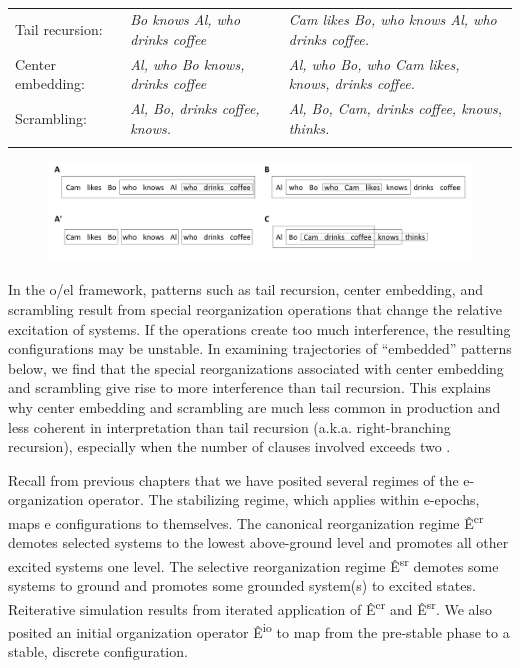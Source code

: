 \begin{table}
\begin{tabularx}{\textwidth}{lQQ}
\lsptoprule
Tail recursion: & \textit{Bo knows Al, who drinks coffee} & \textit{Cam likes Bo, who knows Al, who drinks coffee.}\\
Center embedding: & \textit{Al, who Bo knows, drinks coffee} & \textit{Al, who Bo, who Cam likes, knows, drinks coffee.}\\
Scrambling: & \textit{Al, Bo, drinks coffee, knows.} & \textit{Al, Bo, Cam, drinks coffee, knows, thinks.}\\
\lspbottomrule
\end{tabularx}
\caption{\missingcaption}\label{tab:5:3}
\end{table}
  
\begin{figure}
\includegraphics[width=\textwidth]{figures/Tilsen-img118.png}
\caption{\missingcaption}
\label{fig:5:14}
\end{figure}
 

  In the o/el framework, patterns such as tail recursion, center embedding, and scrambling result from special reorganization operations that change the relative excitation of systems. If the operations create too much interference, the resulting configurations may be unstable. In examining trajectories of “embedded” patterns below, we find that the special reorganizations associated with center embedding and scrambling give rise to more interference than tail recursion. This explains why center embedding and scrambling are much less common in production and less coherent in interpretation than tail recursion (a.k.a. right-branching recursion), especially when the number of clauses involved exceeds two \citep{ChristiansenChater1999}. 

  Recall from previous chapters that we have posited several regimes of the e-organization operator. The stabilizing regime, which applies within e-epochs, maps e configurations to themselves. The canonical reorganization regime Ê\textsuperscript{cr} demotes selected systems to the lowest above-ground level and promotes all other excited systems one level. The selective reorganization regime Ê\textsuperscript{sr} demotes some systems to ground and promotes some grounded system(s) to excited states. Reiterative simulation results from iterated application of Ê\textsuperscript{cr} and Ê\textsuperscript{sr}. We also posited an initial organization operator Ê\textsuperscript{io} to map from the pre-stable phase to a stable, discrete configuration.

